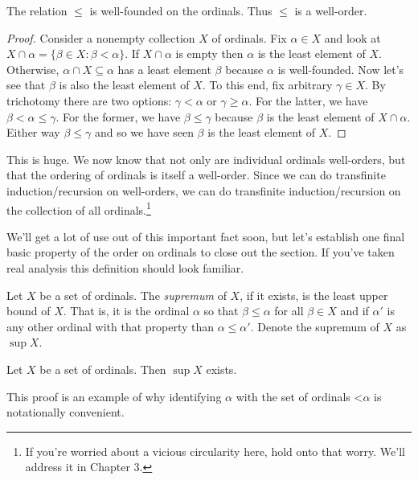 \documentclass[10pt]{amsart}
\begin{document}
\begin{corollary}
The relation $\le$ is well-founded on the ordinals. Thus $\le$ is a well-order.
\end{corollary}

\begin{proof}
Consider a nonempty collection $X$ of ordinals. Fix $\alpha \in X$ and look at $X \cap \alpha = \{ \beta \in X : \beta < \alpha\}$. If $X \cap \alpha$ is empty then $\alpha$ is the least element of $X$. Otherwise, $\alpha \cap X \subseteq \alpha$ has a least element $\beta$ because $\alpha$ is well-founded. Now let's see that $\beta$ is also the least element of $X$. To this end, fix arbitrary $\gamma \in X$. By trichotomy there are two options: $\gamma < \alpha$ or $\gamma \ge \alpha$. For the latter, we have $\beta < \alpha \le \gamma$. For the former, we have $\beta \le \gamma$ because $\beta$ is the least element of $X \cap \alpha$. Either way $\beta \le \gamma$ and so we have seen $\beta$ is the least element of $X$.
\end{proof}

This is huge. We now know that not only are individual ordinals well-orders, but that the ordering of ordinals is itself a well-order. Since we can do transfinite induction/recursion on well-orders, we can do transfinite induction/recursion on the collection of all ordinals.\footnote{If you're worried about a vicious circularity here, hold onto that worry. We'll address it in Chapter 3.}
\smallskip

We'll get a lot of use out of this important fact soon, but let's establish one final basic property of the order on ordinals to close out the section.
If you've taken real analysis this definition should look familiar.

\begin{definition}
Let $X$ be a set of ordinals. The \emph{supremum} of $X$, if it exists, is the least upper bound of $X$. That is, it is the ordinal $\alpha$ so that $\beta \le \alpha$ for all $\beta \in X$ and if $\alpha'$ is any other ordinal with that property than $\alpha \le \alpha'$. Denote the supremum of $X$ as $\sup X$.
\end{definition}

\begin{lemma}
Let $X$ be a set of ordinals. Then $\sup X$ exists.
\end{lemma}

This proof is an example of why identifying $\alpha$ with the set of ordinals $\mathord<\alpha$ is notationally convenient. 
\end{document}
